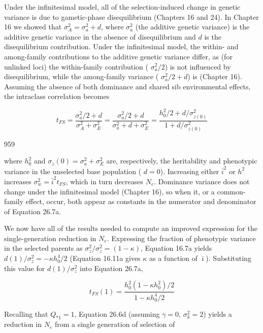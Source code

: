 \documentclass{article}
\begin{document}
Under the infinitesimal model, all of the selection-induced change in genetic variance is due to gametic-phase disequilibrium (Chapters 16 and 24). In Chapter 16 we showed that  $ \sigma_A^2 = \sigma_a^2 + d $, where  $ \sigma_a^2 $ (the additive genetic variance) is the additive genetic variance in the absence of disequilibrium and  $ d $ is the disequilibrium contribution. Under the infinitesimal model, the within- and among-family contributions to the additive genetic variance differ, as (for unlinked loci) the within-family contribution ( $ \sigma_a^2/2 $) is not influenced by disequilibrium, while the among-family variance ( $ \sigma_a^2/2 + d $) is (Chapter 16). Assuming the absence of both dominance and shared sib environmental effects, the intraclass correlation becomes

\begin{equation}
t_{FS}=\frac{\sigma_{a}^{2}/2+d}{\sigma_{A}^{2}+\sigma_{E}^{2}}=\frac{\sigma_{a}^{2}/2+d}{\sigma_{a}^{2}+d+\sigma_{E}^{2}}=\frac{h_{0}^{2}/2+d/\sigma_{z(0)}^{2}}{1+d/\sigma_{z(0)}^{2}}
\tag{26.7a}
\label{eq:26_7a}
\end{equation}

959

where  $ h_0^2 $ and  $ \sigma_z(0) = \sigma_a^2 + \sigma_E^2 $ are, respectively, the heritability and phenotypic variance in the unselected base population ( $ d = 0 $). Increasing either  $ \bar{i}^2 $ or  $ h^2 $ increases  $ \sigma_w^2 = \bar{i}^2 t_{FS} $, which in turn decreases  $ N_e $. Dominance variance does not change under the infinitesimal model (Chapter 16), so when it, or a common-family effect, occur, both appear as constants in the numerator and denominator of Equation 26.7a.

We now have all of the results needed to compute an improved expression for the single-generation reduction in  $ N_e $. Expressing the fraction of phenotypic variance in the selected parents as  $ \sigma_z^2/\sigma_z^2 = (1 - \kappa) $, Equation 16.7a yields  $ d(1)/\sigma_z^2 = -\kappa h_0^4/2 $ (Equation 16.11a gives  $ \kappa $ as a function of  $ \bar{\imath} $). Substituting this value for  $ d(1)/\sigma_z^2 $ into Equation 26.7a,

\begin{equation}
t_{FS}(1)=\frac{h_{0}^{2}(1-\kappa h_{0}^{2})/2}{1-\kappa h_{0}^{4}/2}
\tag{26.7b}
\label{eq:26_7b}
\end{equation}

Recalling that  $ Q_{*1} = 1 $, Equation 26.6d (assuming  $ \gamma = 0 $,  $ \sigma_k^2 = 2 $) yields a reduction in  $ N_e $ from a single generation of selection of
\end{document}
